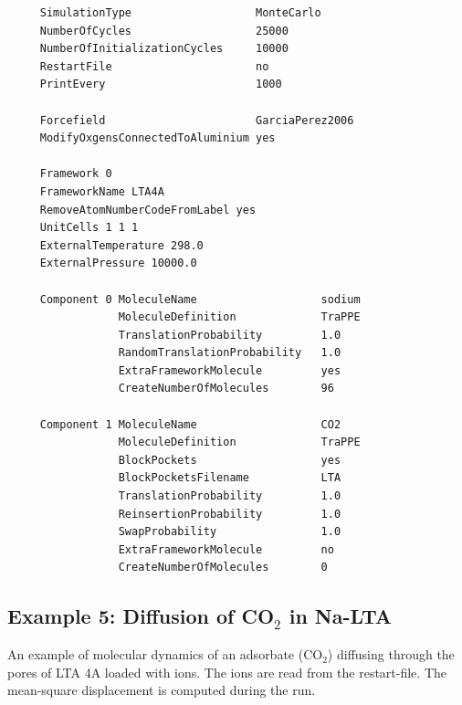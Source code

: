 \begin{tiny}
\begin{verbatim}
     SimulationType                   MonteCarlo
     NumberOfCycles                   25000
     NumberOfInitializationCycles     10000
     RestartFile                      no
     PrintEvery                       1000
     
     Forcefield                       GarciaPerez2006
     ModifyOxgensConnectedToAluminium yes
     
     Framework 0
     FrameworkName LTA4A
     RemoveAtomNumberCodeFromLabel yes
     UnitCells 1 1 1
     ExternalTemperature 298.0
     ExternalPressure 10000.0
     
     Component 0 MoleculeName                   sodium
                 MoleculeDefinition             TraPPE
                 TranslationProbability         1.0
                 RandomTranslationProbability   1.0
                 ExtraFrameworkMolecule         yes
                 CreateNumberOfMolecules        96
     
     Component 1 MoleculeName                   CO2
                 MoleculeDefinition             TraPPE
                 BlockPockets                   yes
                 BlockPocketsFilename           LTA
                 TranslationProbability         1.0
                 ReinsertionProbability         1.0
                 SwapProbability                1.0
                 ExtraFrameworkMolecule         no
                 CreateNumberOfMolecules        0
\end{verbatim}
\end{tiny}

\subsection*{Example 5: Diffusion of CO$_2$ in Na-LTA}

An example of molecular dynamics of an adsorbate (CO$_2$) diffusing through the pores of LTA 4A loaded with ions.
The ions are read from the restart-file. The mean-square displacement is computed during the run.

